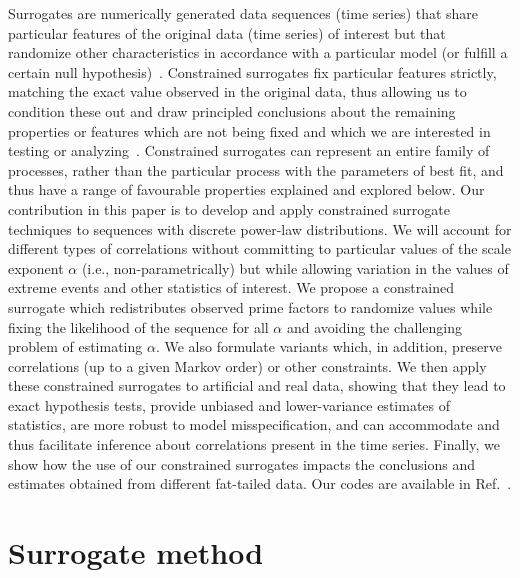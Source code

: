 \documentclass[%
prx,
reprint,
superscriptaddress,
nofootinbib,
 amsmath,amssymb,
 aps,
floatfix,
]{revtex4-2}
\begin{document}
Surrogates are numerically generated data sequences (time series) that share particular features of the original data (time series) of interest but that randomize other characteristics in accordance with a particular model (or fulfill a certain null hypothesis)~\cite{bradley2015nonlinear,paluvs2007nonlinearity}.
%
Constrained surrogates fix particular features strictly, matching the exact value observed in the original data, thus allowing us to condition these out and draw principled conclusions about the remaining properties or features which are not being fixed and which we are interested in testing or analyzing~\cite{lancaster2018surrogate,van1998testing}.
Constrained surrogates can represent an entire family of processes, rather than the particular process with the parameters of best fit, and thus have a range of favourable properties explained and explored below. 
Our contribution in this paper is to develop and apply constrained surrogate techniques to sequences with discrete power-law distributions. We will account for different types of correlations without committing to particular values of the scale exponent $\alpha$ (i.e., non-parametrically) but while allowing variation in the values of extreme events and other statistics of interest. We propose a constrained surrogate which redistributes observed prime factors to randomize values while fixing the likelihood of the sequence for all $\alpha$ and avoiding the challenging problem of estimating $\alpha$. We also formulate variants which, in addition, preserve correlations (up to a given Markov order) or other constraints. We then apply these constrained surrogates to artificial and real data, showing that they lead to exact hypothesis tests, provide unbiased and lower-variance estimates of statistics, are more robust to model misspecification, and can accommodate and thus facilitate inference about correlations present in the time series. Finally, we show how the use of our constrained surrogates impacts the conclusions and estimates obtained from different fat-tailed data. Our codes are available in Ref.~\cite{github}.



\section{Surrogate method}
\end{document}
